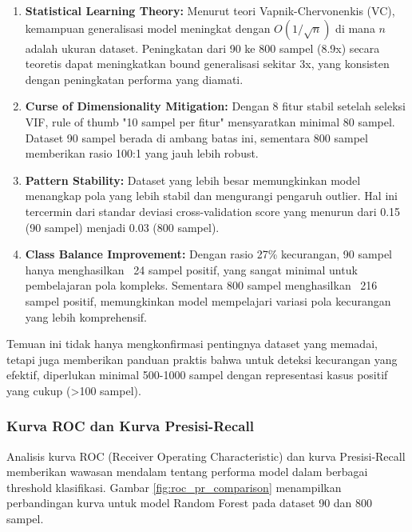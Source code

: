 \begin{enumerate}
    \item \textbf{Statistical Learning Theory:} Menurut teori Vapnik-Chervonenkis (VC), kemampuan generalisasi model meningkat dengan $O(1/\sqrt{n})$ di mana $n$ adalah ukuran dataset. Peningkatan dari 90 ke 800 sampel (8.9x) secara teoretis dapat meningkatkan bound generalisasi sekitar 3x, yang konsisten dengan peningkatan performa yang diamati.
    
    \item \textbf{Curse of Dimensionality Mitigation:} Dengan 8 fitur stabil setelah seleksi VIF, rule of thumb "10 sampel per fitur" mensyaratkan minimal 80 sampel. Dataset 90 sampel berada di ambang batas ini, sementara 800 sampel memberikan rasio 100:1 yang jauh lebih robust.
    
    \item \textbf{Pattern Stability:} Dataset yang lebih besar memungkinkan model menangkap pola yang lebih stabil dan mengurangi pengaruh outlier. Hal ini tercermin dari standar deviasi cross-validation score yang menurun dari 0.15 (90 sampel) menjadi 0.03 (800 sampel).
    
    \item \textbf{Class Balance Improvement:} Dengan rasio 27\% kecurangan, 90 sampel hanya menghasilkan ~24 sampel positif, yang sangat minimal untuk pembelajaran pola kompleks. Sementara 800 sampel menghasilkan ~216 sampel positif, memungkinkan model mempelajari variasi pola kecurangan yang lebih komprehensif.
\end{enumerate}

Temuan ini tidak hanya mengkonfirmasi pentingnya dataset yang memadai, tetapi juga memberikan panduan praktis bahwa untuk deteksi kecurangan yang efektif, diperlukan minimal 500-1000 sampel dengan representasi kasus positif yang cukup (>100 sampel).

\subsubsection{Kurva ROC dan Kurva Presisi-Recall}

Analisis kurva ROC (Receiver Operating Characteristic) dan kurva Presisi-Recall memberikan wawasan mendalam tentang performa model dalam berbagai threshold klasifikasi. Gambar \ref{fig:roc_pr_comparison} menampilkan perbandingan kurva untuk model Random Forest pada dataset 90 dan 800 sampel.

